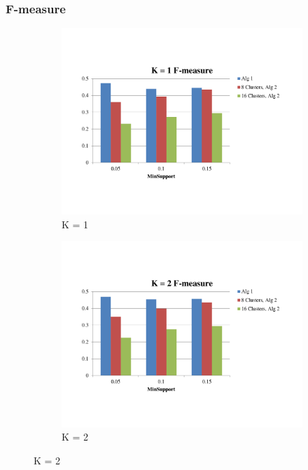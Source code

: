\subsubsection{F-measure}
\begin{figure}
        \centering
        \begin{subfigure}[b]{0.3\textwidth}
         \includegraphics[width=\textwidth]{F-measure1}
         \caption{K = 1}
         \label{Fig:F-measure1}
        \end{subfigure}
        \begin{subfigure}[b]{0.3\textwidth}
         \includegraphics[width=\textwidth]{F-measure2}
         \caption{K = 2}

\end{subfigure}
\end{figure}
